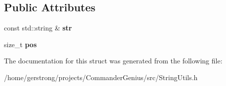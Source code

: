 \subsection*{Public Attributes}
\begin{DoxyCompactItemize}
\item 
\hypertarget{structconst__string__iterator_acea3f040cb0e5256f9d83bdde02416d0}{
const std::string \& {\bfseries str}}
\label{structconst__string__iterator_acea3f040cb0e5256f9d83bdde02416d0}

\item 
\hypertarget{structconst__string__iterator_a7f7e2a10967187d99773a75ed2b31435}{
size\_\-t {\bfseries pos}}
\label{structconst__string__iterator_a7f7e2a10967187d99773a75ed2b31435}

\end{DoxyCompactItemize}


The documentation for this struct was generated from the following file:\begin{DoxyCompactItemize}
\item 
/home/gerstrong/projects/CommanderGenius/src/StringUtils.h\end{DoxyCompactItemize}
